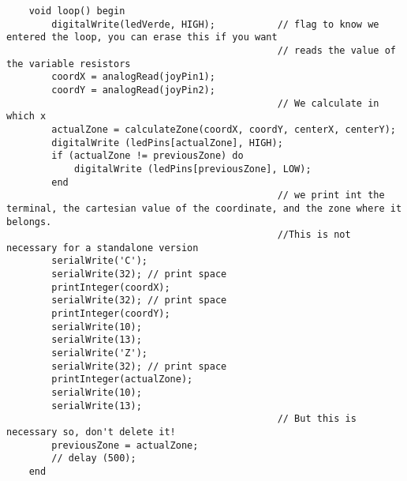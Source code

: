 \begin{lstlisting}
    void loop() begin
        digitalWrite(ledVerde, HIGH);           // flag to know we entered the loop, you can erase this if you want
                                                // reads the value of the variable resistors 
        coordX = analogRead(joyPin1);   
        coordY = analogRead(joyPin2);   
                                                // We calculate in which x
        actualZone = calculateZone(coordX, coordY, centerX, centerY); 
        digitalWrite (ledPins[actualZone], HIGH);     
        if (actualZone != previousZone) do
            digitalWrite (ledPins[previousZone], LOW);
        end
                                                // we print int the terminal, the cartesian value of the coordinate, and the zone where it belongs. 
                                                //This is not necessary for a standalone version
        serialWrite('C');
        serialWrite(32); // print space
        printInteger(coordX);
        serialWrite(32); // print space
        printInteger(coordY);
        serialWrite(10);
        serialWrite(13);
        serialWrite('Z');
        serialWrite(32); // print space
        printInteger(actualZone);
        serialWrite(10);
        serialWrite(13);
                                                // But this is necessary so, don't delete it!
        previousZone = actualZone;
        // delay (500);
    end
\end{lstlisting}